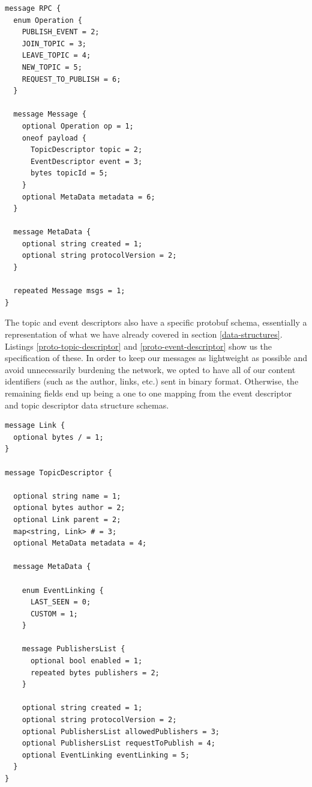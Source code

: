 \noindent\begin{minipage}{\textwidth}
\vspace{8pt}
\begin{lstlisting}[language=protobuf3,caption={Protobuf schema for our RPC messages},label={proto-rpc-message}]
message RPC {
  enum Operation {
    PUBLISH_EVENT = 2;
    JOIN_TOPIC = 3;
    LEAVE_TOPIC = 4;
    NEW_TOPIC = 5;
    REQUEST_TO_PUBLISH = 6;
  }

  message Message {
    optional Operation op = 1;
    oneof payload {
      TopicDescriptor topic = 2;
      EventDescriptor event = 3;
      bytes topicId = 5;
    }
    optional MetaData metadata = 6;
  }

  message MetaData {
    optional string created = 1;
    optional string protocolVersion = 2;
  }

  repeated Message msgs = 1;
}
\end{lstlisting}
\vspace{8pt}
\end{minipage}

The topic and event descriptors also have a specific protobuf schema,
essentially a representation of what we have already covered in section
\ref{data-structures}. Listings \ref{proto-topic-descriptor} and
\ref{proto-event-descriptor} show us the specification of these. In order to
keep our messages as lightweight as possible and avoid unnecessarily burdening
the network, we opted to have all of our content identifiers (such as the
author, links, etc.) sent in binary format. Otherwise, the remaining fields end
up being a one to one mapping from the event descriptor and topic descriptor
data structure schemas.

\noindent\begin{minipage}{\textwidth}
\vspace{8pt}
\begin{lstlisting}[language=protobuf3,caption={Protobuf schema of the topic descriptor},label={proto-topic-descriptor}]
message Link {
  optional bytes / = 1;
}

message TopicDescriptor {

  optional string name = 1;
  optional bytes author = 2;
  optional Link parent = 2;
  map<string, Link> # = 3;
  optional MetaData metadata = 4;

  message MetaData {

    enum EventLinking {
      LAST_SEEN = 0;
      CUSTOM = 1;
    }

    message PublishersList {
      optional bool enabled = 1;
      repeated bytes publishers = 2;
    }

    optional string created = 1;
    optional string protocolVersion = 2;
    optional PublishersList allowedPublishers = 3;
    optional PublishersList requestToPublish = 4;
    optional EventLinking eventLinking = 5;
  }
}
\end{lstlisting}
\vspace{8pt}
\end{minipage}

